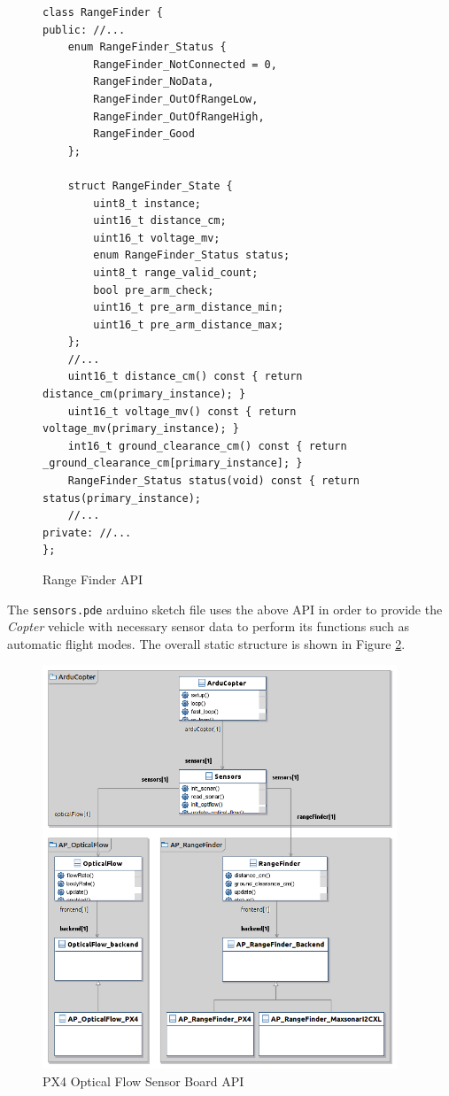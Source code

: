 \documentclass[paper=letter, fontsize=11pt]{scrartcl}
\numberwithin{equation}{section}
\numberwithin{figure}{section}
\numberwithin{table}{section}
\begin{document}
\begin{figure}[h]
	\begin{lstlisting}[basicstyle=\scriptsize]
class RangeFinder {
public: //...
	enum RangeFinder_Status {
		RangeFinder_NotConnected = 0,
		RangeFinder_NoData,
		RangeFinder_OutOfRangeLow,
		RangeFinder_OutOfRangeHigh,
		RangeFinder_Good
	};
	
	struct RangeFinder_State {
		uint8_t instance;
		uint16_t distance_cm;
		uint16_t voltage_mv;
		enum RangeFinder_Status status;
		uint8_t range_valid_count;
		bool pre_arm_check;
		uint16_t pre_arm_distance_min;
		uint16_t pre_arm_distance_max;
	};
	//...
	uint16_t distance_cm() const { return distance_cm(primary_instance); }
	uint16_t voltage_mv() const { return voltage_mv(primary_instance); }
	int16_t ground_clearance_cm() const { return _ground_clearance_cm[primary_instance]; }
	RangeFinder_Status status(void) const { return status(primary_instance);
	//...
private: //...
};
	\end{lstlisting}
	\caption{Range Finder \ac{API}}
	\label{fig:range_finder_api}
\end{figure}

\par
The \texttt{sensors.pde} arduino sketch file uses the above \ac{API} in order
to provide the {\em Copter} vehicle with necessary sensor data to perform its
functions such as automatic flight modes. The overall static structure is shown
in Figure \ref{fig:of_sensor_board_api}.

\begin{figure}[h]
	\centering
    \includegraphics[width=400px]{graphics/OpticalFlowDiagram.png}
	\caption{PX4 Optical Flow Sensor Board \ac{API}}
	\label{fig:of_sensor_board_api}
\end{figure}
\end{document}
